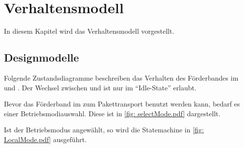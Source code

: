 \documentclass[./\jobname.tex]{subfiles}
\begin{document}
%
%
\chapter{Verhaltensmodell}
%
In diesem Kapitel wird das Verhaltensmodell vorgestellt.
%
\section{Designmodelle}
%
Folgende Zustandsdiagramme beschreiben das Verhalten des Förderbandes im \modeA und \modeB.
Der Wechsel zwischen \modeA und \modeB ist nur im \enquote{Idle-State} erlaubt.\par
Bevor das Förderband im \modeB zum Pakettransport benutzt werden kann, bedarf es einer Betriebsmodiauswahl. Diese ist in  \autoref{fig: selectMode.pdf} dargestellt.
%
\begin{figure}[H]
	\centering
	\noindent{}
	\label{fig: selectMode.pdf}
\end{figure}
%
Ist der Betriebsmodus \modeA angewählt, so wird die Statemachine in \autoref{fig: LocalMode.pdf} ausgeführt.
%
\end{document}
